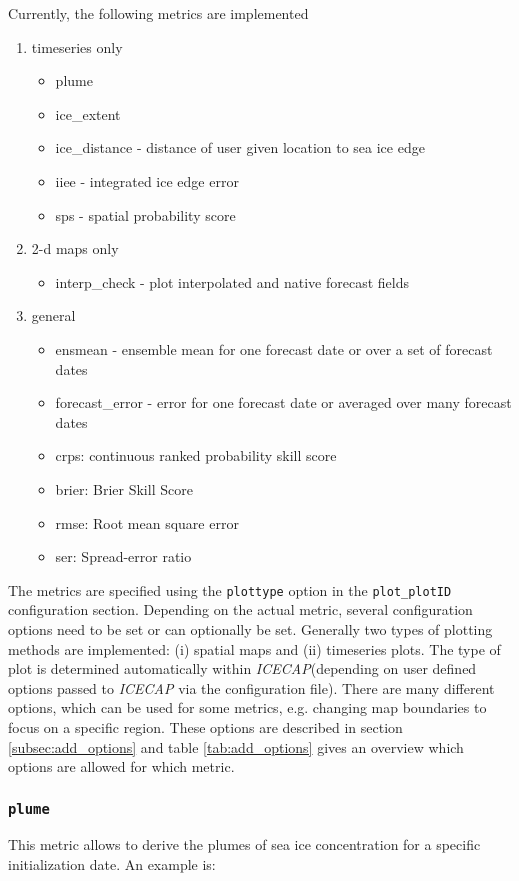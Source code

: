 \documentclass[DIV=10, parskip=full]{scrreprt}
\newcommand{\ice}{\textit{ICECAP}\xspace}
\begin{document}
Currently, the following metrics are implemented
\begin{enumerate}
	\item timeseries only
	\begin{itemize}
		\item plume
		\item ice\_extent
		\item ice\_distance - distance of user given location to sea ice edge 
		\item iiee - integrated ice edge error
		\item sps - spatial probability score
	\end{itemize}
	\item 2-d maps only
	\begin{itemize}
		\item interp\_check - plot interpolated and native forecast fields
	\end{itemize}
	\item general
		\begin{itemize}
		\item ensmean - ensemble mean for one forecast date or over a set of forecast dates 
		\item forecast\_error - error for one forecast date or averaged over many forecast dates
		\item crps: continuous ranked probability skill score
		\item brier: Brier Skill Score
		\item rmse: Root mean square error
		\item ser: Spread-error ratio
	\end{itemize}
\end{enumerate}

The metrics are specified using the \texttt{plottype} option in the \texttt{plot\_plotID} configuration section. Depending on the actual metric, several configuration options need to be set or can optionally be set. Generally two types of plotting methods are implemented: (i) spatial maps and (ii) timeseries plots. The type of plot is determined automatically within \ice (depending on user defined options passed to \ice via the configuration file). There are many different options, which can be used for some metrics, e.g. changing map boundaries to focus on a specific region. These options are described in section \ref{subsec:add_options} and table \ref{tab:add_options} gives an overview which options are allowed for which metric.


\subsubsection{\texttt{plume}}
This metric allows to derive the plumes of sea ice concentration for a specific initialization date. An example is:
\end{document}
